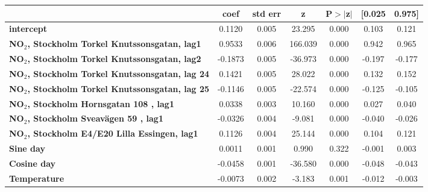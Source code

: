 \begin{landscape}
\begin{table}
\begin{center}
\begin{tabular}{lclc}
\bottomrule
\end{tabular}
\begin{tabular}{lcccccc}
                                                            & \textbf{coef} & \textbf{std err} & \textbf{z} & \textbf{P$> |$z$|$} & \textbf{[0.025} & \textbf{0.975]}  \\
\midrule
\textbf{intercept}                                          &       0.1120  &        0.005     &    23.295  &         0.000        &        0.103    &        0.121     \\
\textbf{NO$_2$, Stockholm Torkel Knutssonsgatan, lag1}   &       0.9533  &        0.006     &   166.039  &         0.000        &        0.942    &        0.965     \\
\textbf{NO$_2$, Stockholm Torkel Knutssonsgatan, lag2}   &      -0.1873  &        0.005     &   -36.973  &         0.000        &       -0.197    &       -0.177     \\
\textbf{NO$_2$, Stockholm Torkel Knutssonsgatan, lag 24} &       0.1421  &        0.005     &    28.022  &         0.000        &        0.132    &        0.152     \\
\textbf{NO$_2$, Stockholm Torkel Knutssonsgatan, lag 25} &      -0.1146  &        0.005     &   -22.574  &         0.000        &       -0.125    &       -0.105     \\
\textbf{NO$_2$, Stockholm Hornsgatan 108 , lag1}         &       0.0338  &        0.003     &    10.160  &         0.000        &        0.027    &        0.040     \\
\textbf{NO$_2$, Stockholm Sveavägen 59 , lag1}           &      -0.0326  &        0.004     &    -9.081  &         0.000        &       -0.040    &       -0.026     \\
\textbf{NO$_2$, Stockholm E4/E20 Lilla Essingen, lag1}   &       0.1126  &        0.004     &    25.144  &         0.000        &        0.104    &        0.121     \\
\textbf{Sine day}                                           &       0.0011  &        0.001     &     0.990  &         0.322        &       -0.001    &        0.003     \\
\textbf{Cosine day}                                         &      -0.0458  &        0.001     &   -36.580  &         0.000        &       -0.048    &       -0.043     \\
\textbf{Temperature}                                        &      -0.0073  &        0.002     &    -3.183  &         0.001        &       -0.012    &       -0.003     \\

\end{tabular}
\end{center}
\end{table}
\end{landscape}

